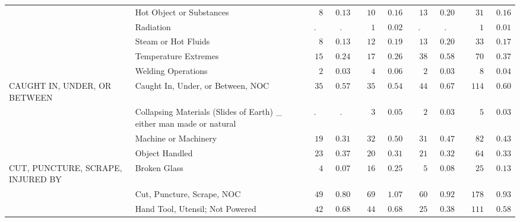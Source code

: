 \documentclass[9pt, oneside]{article}   	%
\begin{document}
\begin{longtable}{p{1.8in}p{2.2in}cccccccc}
 & Hot Object or Substances  & $\phantom{000}8$ & $\phantom{0}0.13$ & $\phantom{00}10$ & $\phantom{0}0.16$ & $\phantom{00}13$ & $\phantom{0}0.20$ & $\phantom{000}31$ & $\phantom{0}0.16$ \\
 & Radiation  & . & . & $\phantom{000}1$ & $\phantom{0}0.02$ & . & . & $\phantom{0000}1$ & $\phantom{0}0.01$ \\
 & Steam or Hot Fluids  & $\phantom{000}8$ & $\phantom{0}0.13$ & $\phantom{00}12$ & $\phantom{0}0.19$ & $\phantom{00}13$ & $\phantom{0}0.20$ & $\phantom{000}33$ & $\phantom{0}0.17$ \\
 & Temperature Extremes  & $\phantom{00}15$ & $\phantom{0}0.24$ & $\phantom{00}17$ & $\phantom{0}0.26$ & $\phantom{00}38$ & $\phantom{0}0.58$ & $\phantom{000}70$ & $\phantom{0}0.37$ \\
 & Welding Operations  & $\phantom{000}2$ & $\phantom{0}0.03$ & $\phantom{000}4$ & $\phantom{0}0.06$ & $\phantom{000}2$ & $\phantom{0}0.03$ & $\phantom{0000}8$ & $\phantom{0}0.04$ \\
CAUGHT IN, UNDER, OR BETWEEN & Caught In, Under, or Between, NOC  & $\phantom{00}35$ & $\phantom{0}0.57$ & $\phantom{00}35$ & $\phantom{0}0.54$ & $\phantom{00}44$ & $\phantom{0}0.67$ & $\phantom{00}114$ & $\phantom{0}0.60$ \\
 & Collapsing Materials (Slides of Earth) \_ either man made or natural  & . & . & $\phantom{000}3$ & $\phantom{0}0.05$ & $\phantom{000}2$ & $\phantom{0}0.03$ & $\phantom{0000}5$ & $\phantom{0}0.03$ \\
 & Machine or Machinery  & $\phantom{00}19$ & $\phantom{0}0.31$ & $\phantom{00}32$ & $\phantom{0}0.50$ & $\phantom{00}31$ & $\phantom{0}0.47$ & $\phantom{000}82$ & $\phantom{0}0.43$ \\
 & Object Handled  & $\phantom{00}23$ & $\phantom{0}0.37$ & $\phantom{00}20$ & $\phantom{0}0.31$ & $\phantom{00}21$ & $\phantom{0}0.32$ & $\phantom{000}64$ & $\phantom{0}0.33$ \\
CUT, PUNCTURE, SCRAPE, INJURED BY & Broken Glass  & $\phantom{000}4$ & $\phantom{0}0.07$ & $\phantom{00}16$ & $\phantom{0}0.25$ & $\phantom{000}5$ & $\phantom{0}0.08$ & $\phantom{000}25$ & $\phantom{0}0.13$ \\
 & Cut, Puncture, Scrape, NOC  & $\phantom{00}49$ & $\phantom{0}0.80$ & $\phantom{00}69$ & $\phantom{0}1.07$ & $\phantom{00}60$ & $\phantom{0}0.92$ & $\phantom{00}178$ & $\phantom{0}0.93$ \\
 & Hand Tool, Utensil; Not Powered  & $\phantom{00}42$ & $\phantom{0}0.68$ & $\phantom{00}44$ & $\phantom{0}0.68$ & $\phantom{00}25$ & $\phantom{0}0.38$ & $\phantom{00}111$ & $\phantom{0}0.58$ \\

\end{longtable}
\end{document}
